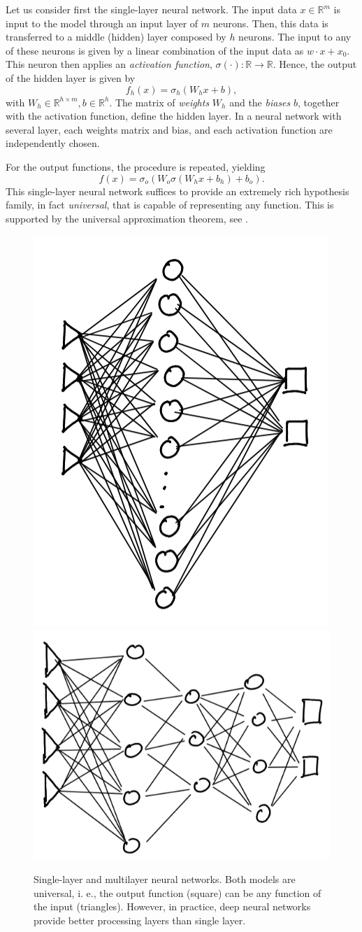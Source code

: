 \documentclass[]{report}
\begin{document}
Let us consider first the single-layer neural network. The input data $x \in \mathbb R^m$ is input to the model through an input layer of $m$ neurons. Then, this data is transferred to a middle (hidden) layer composed by $h$ neurons. The input to any of these neurons is given by a linear combination of the input data as $w \cdot x + x_0$. This neuron then applies an \textit{activation function}, $\sigma(\cdot): \mathbb R \rightarrow \mathbb R$. Hence, the output of the hidden layer is given by
\begin{equation}
f_h(x) = \sigma_h(W_h x + b), 
\end{equation} 
with $W_h \in \mathbb R^{h \times m}, b \in \mathbb R^h$. The matrix of \textit{weights} $W_h$ and the \textit{biases} $b$, together with the activation function, define the hidden layer. In a neural network with several layer, each weights matrix and bias, and each activation function are independently chosen. 

For the output functions, the procedure is repeated, yielding
\begin{equation}
f(x) = \sigma_o(W_o \sigma(W_h x + b_h) + b_o).
\end{equation}
This single-layer neural network suffices to provide an extremely rich hypothesis family, in fact \textit{universal}, that is capable of representing any function. This is supported by the universal approximation theorem, see . 

\begin{figure}
\centering
\includegraphics[height = .475\linewidth]{images/single layer nn}
\includegraphics[height = .475\linewidth]{images/multilayer nn}
\caption{Single-layer and multilayer neural networks. Both models are universal, i. e., the output function (square) can be any function of the input (triangles). However, in practice, deep neural networks provide better processing layers than single layer. }
\label{fig.neural-network}
\end{figure}
\end{document}

